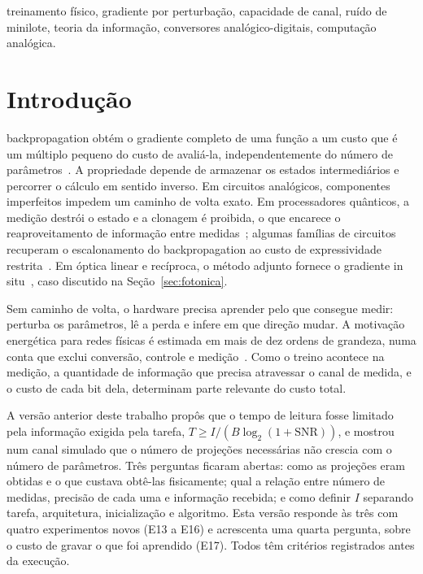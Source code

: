 \documentclass[journal]{IEEEtran}
\newcommand{\SNR}{\mathrm{SNR}}
\begin{document}
\begin{IEEEkeywords}
treinamento físico, gradiente por perturbação, capacidade de canal, ruído de minilote, teoria da informação, conversores analógico-digitais, computação analógica.
\end{IEEEkeywords}

\section{Introdução}

 backpropagation obtém o gradiente completo de uma função a um custo que é um múltiplo pequeno do custo de avaliá-la, independentemente do número de parâmetros~\cite{baur1983}. A propriedade depende de armazenar os estados intermediários e percorrer o cálculo em sentido inverso. Em circuitos analógicos, componentes imperfeitos impedem um caminho de volta exato. Em processadores quânticos, a medição destrói o estado e a clonagem é proibida, o que encarece o reaproveitamento de informação entre medidas~\cite{abbas2023}; algumas famílias de circuitos recuperam o escalonamento do backpropagation ao custo de expressividade restrita~\cite{bowles2025}. Em óptica linear e recíproca, o método adjunto fornece o gradiente in situ~\cite{hughes2018,pai2023}, caso discutido na Seção~\ref{sec:fotonica}.

Sem caminho de volta, o hardware precisa aprender pelo que consegue medir: perturba os parâmetros, lê a perda e infere em que direção mudar. A motivação energética para redes físicas é estimada em mais de dez ordens de grandeza, numa conta que exclui conversão, controle e medição~\cite{tkachenko2025}. Como o treino acontece na medição, a quantidade de informação que precisa atravessar o canal de medida, e o custo de cada bit dela, determinam parte relevante do custo total.

A versão anterior deste trabalho propôs que o tempo de leitura fosse limitado pela informação exigida pela tarefa, $T \ge I/(B\log_2(1+\SNR))$, e mostrou num canal simulado que o número de projeções necessárias não crescia com o número de parâmetros. Três perguntas ficaram abertas: como as projeções eram obtidas e o que custava obtê-las fisicamente; qual a relação entre número de medidas, precisão de cada uma e informação recebida; e como definir $I$ separando tarefa, arquitetura, inicialização e algoritmo. Esta versão responde às três com quatro experimentos novos (E13 a E16) e acrescenta uma quarta pergunta, sobre o custo de gravar o que foi aprendido (E17). Todos têm critérios registrados antes da execução.
\end{document}
